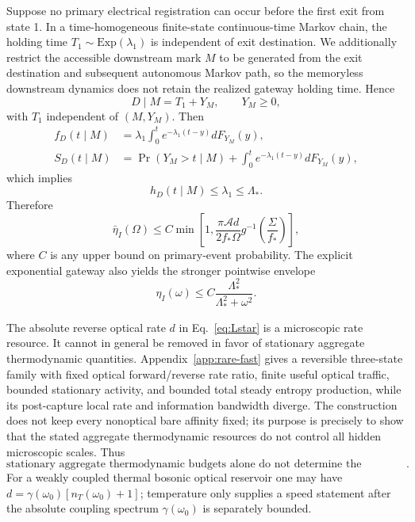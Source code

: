 \documentclass[aps,prapplied,preprint,nofootinbib]{revtex4-2}
\begin{document}
Suppose no primary electrical registration can occur before the first exit from state 1. In a time-homogeneous finite-state continuous-time Markov chain, the holding time $T_1\sim\mathrm{Exp}(\lambda_1)$ is independent of exit destination. We additionally restrict the accessible downstream mark $M$ to be generated from the exit destination and subsequent autonomous Markov path, so the memoryless downstream dynamics does not retain the realized gateway holding time. Hence
\begin{equation}
D\mid M=T_1+Y_M,
\qquad Y_M\ge0,
\end{equation}
with $T_1$ independent of $(M,Y_M)$. Then
\begin{align}
f_D(t\mid M)&=\lambda_1\int_0^t e^{-\lambda_1(t-y)}dF_{Y_M}(y),\\
S_D(t\mid M)&=\Pr(Y_M>t\mid M)+\int_0^t e^{-\lambda_1(t-y)}dF_{Y_M}(y),
\end{align}
which implies
\begin{equation}
\boxed{h_D(t\mid M)\le\lambda_1\le\Lambda_*.}
\label{eq:bridge}
\end{equation}
Therefore
\begin{equation}
\boxed{
\bar\eta_I(\Omega)
\le C\min\left[
1,
\frac{\pi\mathcal A d}{2f_*\Omega}
 g^{-1}\!\left(\frac{\Sigma}{f_*}\right)
\right],}
\label{eq:thermo}
\end{equation}
where $C$ is any upper bound on primary-event probability. The explicit exponential gateway also yields the stronger pointwise envelope
\begin{equation}
\eta_I(\omega)\le
C\frac{\Lambda_*^2}{\Lambda_*^2+\omega^2}.
\end{equation}

The absolute reverse optical rate $d$ in Eq.~\eqref{eq:Lstar} is a microscopic rate resource. It cannot in general be removed in favor of stationary aggregate thermodynamic quantities. Appendix~\ref{app:rare-fast} gives a reversible three-state family with fixed optical forward/reverse rate ratio, finite useful optical traffic, bounded stationary activity, and bounded total steady entropy production, while its post-capture local rate and information bandwidth diverge. The construction does not keep every nonoptical bare affinity fixed; its purpose is precisely to show that the stated aggregate thermodynamic resources do not control all hidden microscopic scales. Thus
\begin{equation}
\boxed{
\text{stationary aggregate thermodynamic budgets alone do not determine the temporal information scale}.}
\end{equation}
For a weakly coupled thermal bosonic optical reservoir one may have $d=\gamma(\omega_0)[n_T(\omega_0)+1]$; temperature only supplies a speed statement after the absolute coupling spectrum $\gamma(\omega_0)$ is separately bounded.
\end{document}
